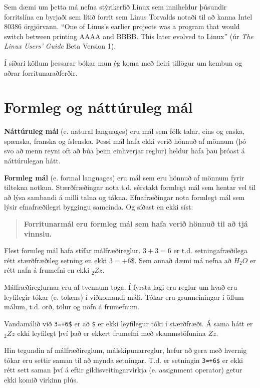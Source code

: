 Sem dæmi um þetta má nefna stýrikerfið Linux sem inniheldur þúsundir forritslína en byrjaði sem lítið forrit sem Linus Torvalds notaði til að kanna Intel 80386 örgjörvann.
``One of Linus's earlier projects was a program that would switch between printing AAAA and BBBB.
This later evolved to Linux'' (úr {\em The Linux Users' Guide} Beta Version 1).


Í síðari köflum þessarar bókar mun ég koma með fleiri tillögur um kembun og aðrar forritunaraðferðir.

\section{Formleg og náttúruleg mál}
\label{formal}

{\bf Náttúruleg mál} (e. natural languages) eru mál sem fólk talar, eins og enska, spænska, franska og íslenska.
Þessi mál hafa ekki verið hönnuð af mönnum (þó svo að menn reyni oft að búa þeim einhverjar reglur) heldur hafa þau þróast á náttúrulegan hátt.

{\bf Formleg mál} (e. formal languages) eru mál sem eru hönnuð af mönnum fyrir tiltekna notkun.
Stærðfræðingar nota t.d. sérstakt formlegt mál sem hentar vel til að lýsa sambandi á milli talna og tákna.
Efnafræðingar nota formlegt mál sem lýsir efnafræðilegri byggingu sameinda.
Og síðast en ekki síst:

\begin{quote}
{\bf Forritunarmál eru formleg mál sem hafa verið hönnuð til að tjá vinnslu.} 
\end{quote}

Flest formleg mál hafa stífar málfræðireglur.
$3+3=6$ er t.d. setningafræðilega rétt stærðfræðileg setning en ekki $3=+6\$$.
Sem annað dæmi má nefna að $H_2O$ er rétt nafn á frumefni en ekki $_2Zz$.

Málfræðireglurnar eru af tvennum toga.
Í fyrsta lagi eru reglur um hvað eru leyfilegir tókar (e. tokens) í viðkomandi máli. 
Tókar eru grunneiningar í öllum málum, t.d. orð, tölur og nöfn á frumefnum.

Vandamálið við {\tt 3=+6\$} er að {\tt \$} er ekki leyfilegur tóki í stærðfræði.
Á sama hátt er $_2Zz$ ekki leyfilegt því það er ekkert frumefni með skammstöfunina $Zz$.

Hin tegundin af málfræðireglum, málskipunarreglur, hefur að gera með hvernig tókar eru settir saman til að mynda setningar.
T.d. er setningin {\tt 3=+6\$} er ekki rétt sett saman því á eftir gildisveitingarvirkja (e. assignment operator) getur ekki komið virkinn plús.

